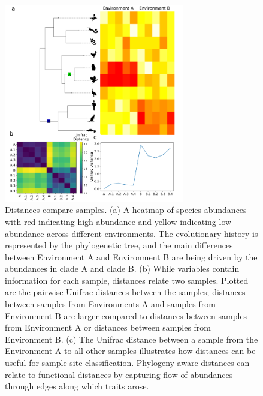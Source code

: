 \begin{figure}[H]
        \centering
        \includegraphics[width=0.7\textwidth]{ch1/figure3.png}
        \caption[A demonstration of how to interpret Unifrac distances.]
        {Distances compare samples. (a) A heatmap of species abundances with red indicating high abundance and yellow indicating low abundance across different environments.  The evolutionary history is represented by the phylogenetic tree, and the main differences between Environment A and Environment B are being driven by the abundances in clade A and clade B. (b) While variables contain information for each sample, distances relate two samples. Plotted are the pairwise Unifrac distances between the samples; distances between samples from Environments A and samples from Environment B are larger compared to distances between samples from Environment A or distances between samples from Environment B. (c) The Unifrac distance between a sample from the Environment A to all other samples illustrates how distances can be useful for sample-site classification. Phylogeny-aware distances can relate to functional distances by capturing flow of abundances through edges along which traits arose.}
        \label{figa3}
\end{figure}

